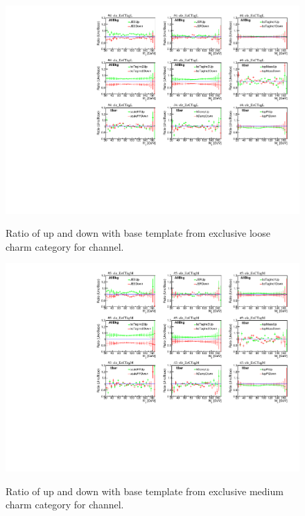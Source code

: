 \begin{figure}
    \centering
    {\includegraphics[width=0.95\linewidth]{Image/SYS/RatioBaseSys/mjj_4_ele_ExCTagL.pdf}}
    \caption{ Ratio of up and down with base template from exclusive loose charm category for \ejets channel.}
    \label{fig:shapeVslnN4}
\end{figure}
\begin{figure}
    \centering
    {\includegraphics[width=0.95\linewidth]{Image/SYS/RatioBaseSys/mjj_5_ele_ExCTagM.pdf}}
    \caption{ Ratio of up and down with base template from exclusive medium charm category for \ejets channel. }
    \label{fig:shapeVslnN5}
\end{figure}


